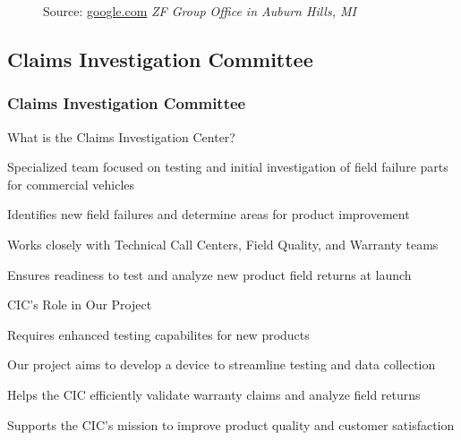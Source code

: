 \documentclass[8pt,compress,aspectratio=169]{beamer}
\begin{document}
\begin{frame}
\begin{minipage}{0.45\textwidth}
\begin{figure}
      \caption{Source: \href{google.com}{google.com}\hspace{\textwidth}
      \textit{ZF Group Office in Auburn Hills, MI}}
    \end{figure}
  \end{minipage}
\end{frame}

\subsection{Claims Investigation Committee}
\begin{frame}
  \frametitle{Claims Investigation Committee}
  \begin{block}{What is the Claims Investigation Center?}
      \begin{itemize}
          \small {
            \item Specialized team focused on testing and initial investigation of field failure parts for commercial vehicles 
            \item Identifies new field failures and determine areas for product improvement
            \item Works closely with Technical Call Centers, Field Quality, and Warranty teams
            \item Ensures readiness to test and analyze new product field returns at launch  
          }
      \end{itemize}
  \end{block}


  \begin{block}{CIC's Role in Our Project}
    \begin{itemize}
        \small {
          \item Requires enhanced testing capabilites for new products
          \item Our project aims to develop a device to streamline testing and data collection
          \item Helps the CIC efficiently validate warranty claims and analyze field returns
          \item Supports the CIC's mission to improve product quality and customer satisfaction
          }
    \end{itemize}
  \end{block}
  \end{frame}
\end{document}

